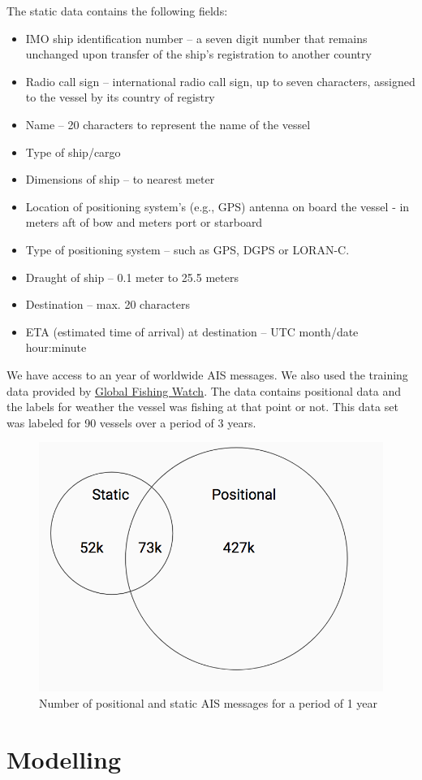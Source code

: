 The static data contains the following fields:

\begin{itemize}
\item IMO ship identification number – a seven digit number that remains unchanged upon transfer of the ship's registration to another country
\item Radio call sign – international radio call sign, up to seven characters, assigned to the vessel by its country of registry
\item Name – 20 characters to represent the name of the vessel
\item Type of ship/cargo
\item Dimensions of ship – to nearest meter
\item Location of positioning system's (e.g., GPS) antenna on board the vessel - in meters aft of bow and meters port or starboard
\item Type of positioning system – such as GPS, DGPS or LORAN-C.
\item Draught of ship – 0.1 meter to 25.5 meters
\item Destination – max. 20 characters
\item ETA (estimated time of arrival) at destination – UTC month/date hour:minute
\end{itemize}

We have access to an year of worldwide AIS messages. We also used the training data provided by \href{globalfishingwatch.github.io}{Global Fishing Watch}. The data contains positional data and the labels for weather the vessel was fishing at that point or not. This data set was labeled for 90 vessels over a period of 3 years.

\begin{figure}[h]
\centering
	\includegraphics[width=0.3\linewidth]{images/ais_summary.png}
	\caption{Number of positional and static AIS messages for a period of 1 year}\label{fig:AIS broadcast summary} 
\end{figure}

\section{Modelling}

